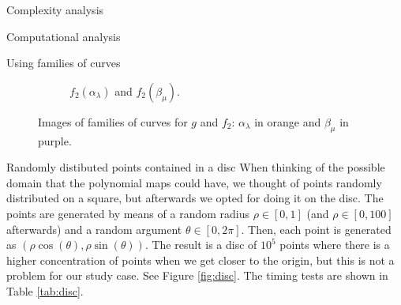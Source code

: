 \documentclass[11pt, a4paper, english, twoside, notitlepage, openright]{report}
\begin{document}
\begin{chapter}{Complexity analysis}
\begin{section}{Computational analysis}
\begin{subsection}{Using families of curves}
\begin{figure}
\begin{subfigure}{.45\linewidth}
\vspace{-0.4cm}\caption{$f_2(\alpha_{\lambda})$ and $f_2(\beta_{\mu})$.\label{fig:3curves3}}
\end{subfigure}
\vspace{-0.1cm}\caption{Images of families of curves for $g$ and $f_2$: $\alpha_{\lambda}$ in orange and $\beta_{\mu}$ in purple.\label{fig:curvesfg}}
\end{figure}

\end{subsection}

\begin{subsection}{Randomly distibuted points contained in a disc}
When thinking of the possible domain that the polynomial maps could have, we thought of points randomly distributed on a square, but afterwards we opted for doing it on the disc. The points are generated by means of a random radius $\rho \in [0, 1]$ (and $\rho \in [0, 100]$ afterwards) and a random argument $\theta\in[0, 2\pi]$. Then, each point is generated as $(\rho\cos(\theta), \rho\sin(\theta))$. The result is a disc of $10^5$ points where there is a higher concentration of points when we get closer to the origin, but this is not a problem for our study case. See Figure \ref{fig:disc}. The timing tests are shown in Table \ref{tab:disc}.


\end{subsection}
\end{section}
\end{chapter}
\end{document}
